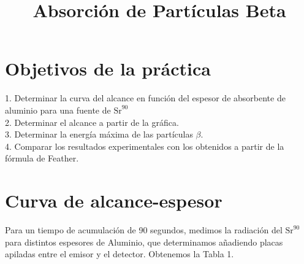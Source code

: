 \documentclass[a4paper,12pt,spanish]{article}
\begin{document}
	
	
	\title{ Absorción de Partículas Beta}
	
	\date{}
	
	\maketitle
	
	
	\section{Objetivos de la práctica}
	
	\vspace{\baselineskip}
	
	1. Determinar la curva del alcance en función del espesor de absorbente de aluminio para una fuente de $\text{Sr}^{90}$\\
	
	2. Determinar el alcance a partir de la gráfica.\\
	
	3. Determinar la energía máxima de las partículas $\beta$.\\
	
	4. Comparar los resultados experimentales con los obtenidos a partir de la fórmula de Feather.\\
	
	
	
	
	
	\section{Curva de alcance-espesor}
	
	Para un tiempo de acumulación de 90 segundos, medimos la radiación del $\text{Sr}^{90}$ para distintos espesores de Aluminio, que determinamos añadiendo placas apiladas entre el emisor y el detector. Obtenemos la Tabla 1. 
	
	
	
\end{document}
